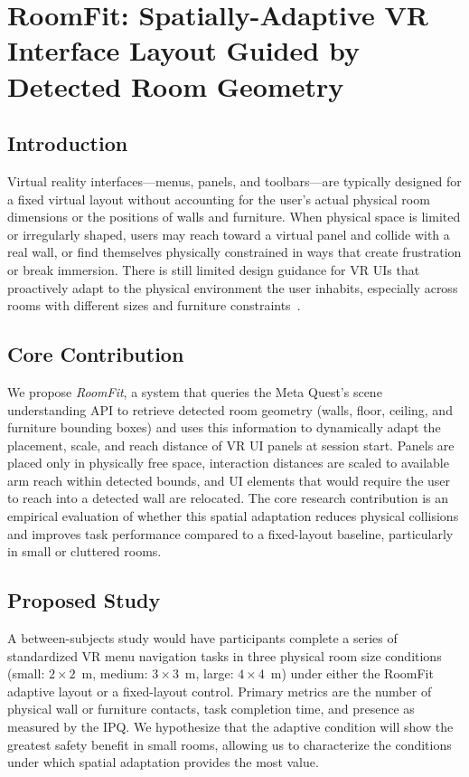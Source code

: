 \documentclass{styling/vgtc}                          %
\begin{document}
\section{RoomFit: Spatially-Adaptive VR Interface Layout Guided by Detected Room Geometry}

\subsection{Introduction}

Virtual reality interfaces---menus, panels, and toolbars---are typically
designed for a fixed virtual layout without accounting for the user's actual
physical room dimensions or the positions of walls and furniture. When
physical space is limited or irregularly shaped, users may reach toward a
virtual panel and collide with a real wall, or find themselves physically
constrained in ways that create frustration or break immersion. There is still limited design guidance for VR UIs that proactively adapt to
the physical environment the user inhabits, especially across rooms with
different sizes and furniture constraints~\cite{cheng2023interactionadapt}.

\subsection{Core Contribution}

We propose \emph{RoomFit}, a system that queries the Meta Quest's scene
understanding API to retrieve detected room geometry (walls, floor, ceiling,
and furniture bounding boxes) and uses this information to dynamically adapt
the placement, scale, and reach distance of VR UI panels at session start.
Panels are placed only in physically free space, interaction distances are
scaled to available arm reach within detected bounds, and UI elements that
would require the user to reach into a detected wall are relocated. The core
research contribution is an empirical evaluation of whether this spatial
adaptation reduces physical collisions and improves task performance
compared to a fixed-layout baseline, particularly in small or cluttered
rooms.

\subsection{Proposed Study}

A between-subjects study would have participants complete a series
of standardized VR menu navigation tasks in three physical room size
conditions (small: $2{\times}2$~m, medium: $3{\times}3$~m, large:
$4{\times}4$~m) under either the RoomFit adaptive layout or a fixed-layout
control. Primary metrics are the number of physical wall or furniture
contacts, task completion time, and presence as measured by the IPQ. We
hypothesize that the adaptive condition will show the greatest safety benefit
in small rooms, allowing us to characterize the conditions under which
spatial adaptation provides the most value.
\end{document}
